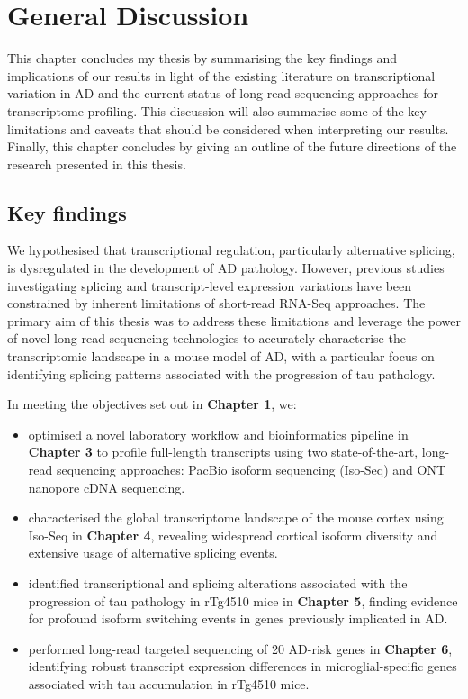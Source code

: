 \cleardoublepage
\chapter{General Discussion}

This chapter concludes my thesis by summarising the key findings and implications of our results in light of the existing literature on transcriptional variation in AD and the current status of long-read sequencing approaches for transcriptome profiling. This discussion will also summarise some of the key limitations and caveats that should be considered when interpreting our results. Finally, this chapter concludes by giving an outline of the future directions of the research presented in this thesis.       

\section{Key findings}
We hypothesised that transcriptional regulation, particularly alternative splicing, is dysregulated in the development of AD pathology. However, previous studies investigating splicing and transcript-level expression variations have been constrained by inherent limitations of short-read RNA-Seq approaches. The primary aim of this thesis was to address these limitations and leverage the power of novel long-read sequencing technologies to accurately characterise the transcriptomic landscape in a mouse model of AD, with a particular focus on identifying splicing patterns associated with the progression of tau pathology.

In meeting the objectives set out in \textbf{Chapter 1}, we:
\begin{itemize}
	\item optimised a novel laboratory workflow and bioinformatics pipeline in \textbf{Chapter 3} to profile full-length transcripts using two state-of-the-art, long-read sequencing approaches: PacBio isoform sequencing (Iso-Seq) and ONT nanopore cDNA sequencing.  
	
	\item characterised the global transcriptome landscape of the mouse cortex using Iso-Seq in \textbf{Chapter 4}, revealing widespread cortical isoform diversity and extensive usage of alternative splicing events. 
	
	\item identified transcriptional and splicing alterations associated with the progression of tau pathology in rTg4510 mice in \textbf{Chapter 5}, finding evidence for profound isoform switching events in genes previously implicated in AD. 
	
	\item performed long-read targeted sequencing of 20 AD-risk genes in \textbf{Chapter 6}, identifying robust transcript expression differences in microglial-specific genes associated with tau accumulation in rTg4510 mice.    
\end{itemize}

